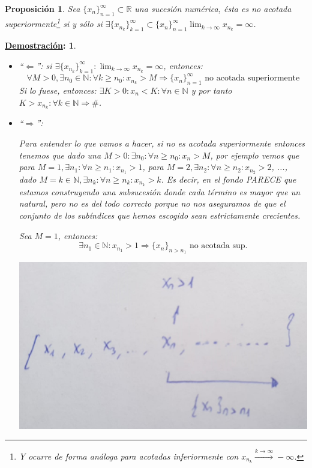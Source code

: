 \documentclass[10pt,a4paper,openright]{book}
\theoremstyle{break}
\newtheorem*{prop}{Proposición}
\newtheorem*{demo}{\underline{Demostración}:}
\begin{document}
\begin{prop}
Sea $\{x_n\}_{n=1}^\infty\subset \mathbb R$ una sucesión numérica, ésta es no acotada superiormente\footnote{Y ocurre de forma análoga para acotadas inferiormente con $x_{n_k}\xrightarrow{k\rightarrow \infty} -\infty$.} si y sólo si $\exists \{x_{n_k}\}_{k=1}^\infty\subset \{x_n\}_{n=1}^\infty \lim_{k\rightarrow \infty} x_{n_k}=\infty$.
\end{prop}
\begin{demo}
\begin{itemize}
\item ``$\Leftarrow$'': si $\exists \{x_{n_k}\}_{k=1}^\infty : \lim_{k\rightarrow \infty}x_{n_k}=\infty$, entonces:
$$\forall M>0, \exists n_0\in \mathbb N: \forall k\geq n_0: x_{n_k}>M\Rightarrow \{x_n\}_{n=1}^\infty\mbox{ no acotada superiormente}$$
Si lo fuese, entonces: $\exists K>0: x_n<K: \forall n\in \mathbb N$ y por tanto $K>x_{n_k}: \forall k\in \mathbb N\Rightarrow \#$.

\item ``$\Rightarrow$'':\par
Para entender lo que vamos a hacer, si no es acotada superiormente entonces tenemos que dado una $M>0:\exists n_0:\forall n\geq n_0: x_n>M$, por ejemplo vemos que para $M=1, \exists n_1:\forall n\geq n_1: x_{n_1}>1$, para $M=2, \exists n_2:\forall n\geq n_2: x_{n_2}>2$, ..., dado $M=k\in \mathbb N, \exists n_k:\forall n\geq n_k: x_{n_k}>k$. Es decir, en el fondo PARECE que estamos construyendo una subsucesión donde cada término es mayor que un natural, pero no es del todo correcto porque no nos aseguramos de que el conjunto de los subíndices que hemos escogido sean estrictamente crecientes.

\par Sea $M=1$, entonces:
$$\exists n_1\in \mathbb N: x_{n_1}>1\Rightarrow \{x_n\}_{n>n_1} \mbox{ no acotada sup.}$$

\begin{center}
\includegraphics[scale=0.15]{proposicion subsucesiones}
\end{center}


\end{itemize}
\end{demo}
\end{document}
